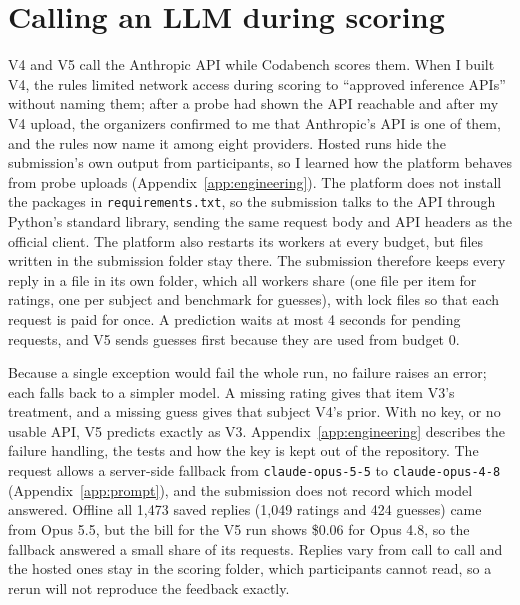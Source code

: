 \section{Calling an LLM during scoring}\label{sec:llm}

V4 and V5 call the Anthropic API while Codabench scores them. When I built V4, the rules limited network access during scoring to ``approved inference APIs'' without naming them; after a probe had shown the API reachable and after my V4 upload, the organizers confirmed to me that Anthropic's API is one of them, and the rules now name it among eight providers. Hosted runs hide the submission's own output from participants, so I learned how the platform behaves from probe uploads (Appendix~\ref{app:engineering}). The platform does not install the packages in \texttt{requirements.txt}, so the submission talks to the API through Python's standard library, sending the same request body and API headers as the official client. The platform also restarts its workers at every budget, but files written in the submission folder stay there. The submission therefore keeps every reply in a file in its own folder, which all workers share (one file per item for ratings, one per subject and benchmark for guesses), with lock files so that each request is paid for once. A prediction waits at most 4 seconds for pending requests, and V5 sends guesses first because they are used from budget 0.

Because a single exception would fail the whole run, no failure raises an error; each falls back to a simpler model. A missing rating gives that item V3's treatment, and a missing guess gives that subject V4's prior. With no key, or no usable API, V5 predicts exactly as V3. Appendix~\ref{app:engineering} describes the failure handling, the tests and how the key is kept out of the repository. The request allows a server-side fallback from \texttt{claude-opus-5-5} to \texttt{claude-opus-4-8} (Appendix~\ref{app:prompt}), and the submission does not record which model answered. Offline all 1,473 saved replies (1,049 ratings and 424 guesses) came from Opus 5.5, but the bill for the V5 run shows \$0.06 for Opus 4.8, so the fallback answered a small share of its requests. Replies vary from call to call and the hosted ones stay in the scoring folder, which participants cannot read, so a rerun will not reproduce the feedback exactly.
